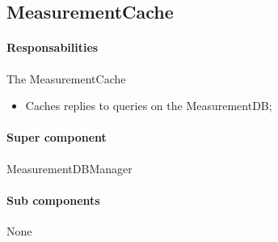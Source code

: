\documentclass[a4paper,10pt]{article}
\begin{document}
\subsection{MeasurementCache}
\paragraph{Responsabilities} 
The MeasurementCache
\begin{itemize}
	\item Caches replies to queries on the MeasurementDB;
\end{itemize}

\paragraph{Super component} MeasurementDBManager

\paragraph{Sub components} None
\end{document}
